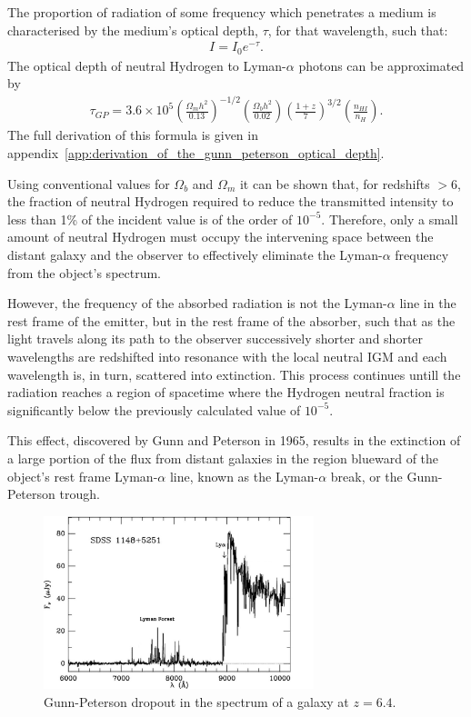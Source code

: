 		The proportion of radiation of some frequency which penetrates a medium is characterised by the medium's optical depth, $\tau$, for that wavelength, such that:
		\begin{align}
			I = I_0 e^{-\tau}. \label{eq:optical_depth}
		\end{align}
		The optical depth of neutral Hydrogen to Lyman-$\alpha$ photons can be approximated by
		\begin{align}
			\tau_{GP} = 3.6 \times 10^5	\left ( 	\frac{\Omega_m h^2}{0.13}	\right ) ^{-1/2}
										\left ( 	\frac{\Omega_b h^2}{0.02}	\right )
										\left ( 	\frac{1+z}{7}			\right )^{3/2}
										\left ( 	\frac{n_{HI}}{n_H}			\right ) . \label{eq:gunn-peterson_tau}
		\end{align}
		The full derivation of this formula is given in appendix~\ref{app:derivation_of_the_gunn_peterson_optical_depth}.

		Using conventional values for $\Omega_b$ and $\Omega_m$ it can be shown that, for redshifts $>6$, the fraction of neutral Hydrogen required to reduce the transmitted intensity to less than 1\% of the incident value is of the order of $10^{-5}$. Therefore, only a small amount of neutral Hydrogen must occupy the intervening space between the distant galaxy and the observer to effectively eliminate the Lyman-$\alpha$ frequency from the object's spectrum.

		However, the frequency  of the absorbed radiation is not the Lyman-$\alpha$ line in the rest frame of the emitter, but in the rest frame of the absorber, such that as the light travels along its path to the observer successively shorter and shorter wavelengths are redshifted into resonance with the local neutral IGM and each wavelength is, in turn, scattered into extinction. This process continues untill the radiation reaches a region of spacetime where the Hydrogen neutral fraction is significantly below the previously calculated value of $10^{-5}$.

		This effect, discovered by Gunn and Peterson in 1965, results in the extinction of a large portion of the flux from distant galaxies in the region blueward of the object's rest frame  Lyman-$\alpha$ line, known as the Lyman-$\alpha$ break, or the Gunn-Peterson trough.
		\begin{figure}[htbp]
			\centering
			\includegraphics[width=0.7\textwidth]{../Images/dropout.jpg}
			\caption{Gunn-Peterson dropout in the spectrum of a galaxy at $z=6.4$.}\label{fig:dropout}
		\end{figure}

